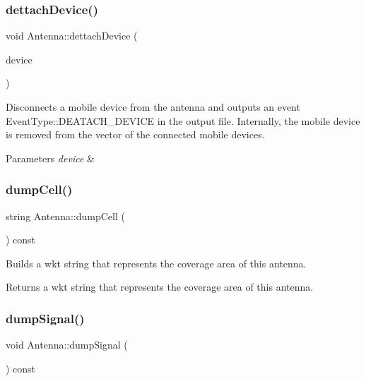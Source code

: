 \subsubsection{\texorpdfstring{dettach\+Device()}{dettachDevice()}}
{\footnotesize\ttfamily void Antenna\+::dettach\+Device (\begin{DoxyParamCaption}\item[{\hyperlink{class_holdable_agent}{Holdable\+Agent} $\ast$}]{device }\end{DoxyParamCaption})}

Disconnects a mobile device from the antenna and outputs an event Event\+Type\+::\+D\+E\+A\+T\+A\+C\+H\+\_\+\+D\+E\+V\+I\+CE in the output file. Internally, the mobile device is removed from the vector of the connected mobile devices. 
\begin{DoxyParams}{Parameters}
{\em device} & \\
\hline
\end{DoxyParams}
\mbox{\label{class_antenna_a8ed18205ff7c675868090e4c80454c2c}} 
\subsubsection{\texorpdfstring{dump\+Cell()}{dumpCell()}}
{\footnotesize\ttfamily string Antenna\+::dump\+Cell (\begin{DoxyParamCaption}{ }\end{DoxyParamCaption}) const}

Builds a wkt string that represents the coverage area of this antenna. \begin{DoxyReturn}{Returns}
a wkt string that represents the coverage area of this antenna. 
\end{DoxyReturn}
\mbox{\label{class_antenna_ad78e7561bf98d891262e6436cd3e1df7}} 
\subsubsection{\texorpdfstring{dump\+Signal()}{dumpSignal()}}
{\footnotesize\ttfamily void Antenna\+::dump\+Signal (\begin{DoxyParamCaption}{ }\end{DoxyParamCaption}) const}

